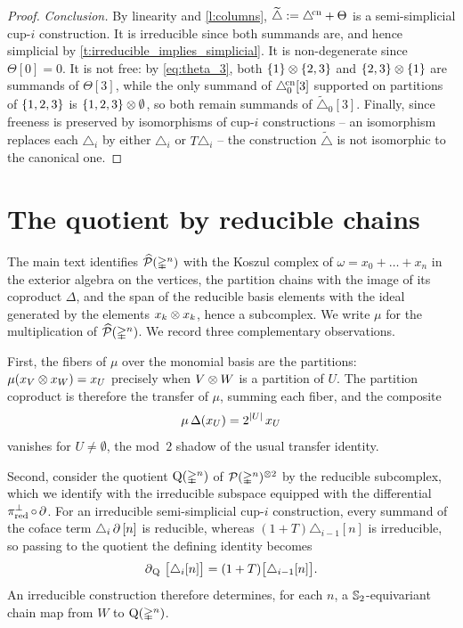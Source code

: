\documentclass{amsart}
\begin{document}
\begin{proof}
	\medskip
	\textit{Conclusion.}
	By linearity and \cref{l:columns}, $\widetilde\triangle := \triangle^{\!\mathrm{cn}} + \Theta$ is a semi-simplicial \mbox{cup-$i$} construction.
	It is irreducible since both summands are, and hence simplicial by \cref{t:irreducible_implies_simplicial}.
	It is non-degenerate since $\Theta[0] = 0$.
	It is not free: by \cref{eq:theta_3}, both $\{1\} \otimes \{2,3\}$ and $\{2,3\} \otimes \{1\}$ are summands of $\Theta[3]$, while the only summand of $\triangle^{\!\mathrm{cn}}_0[3]$ supported on partitions of $\{1,2,3\}$ is $\{1,2,3\} \otimes \emptyset$, so both remain summands of $\widetilde\triangle_0[3]$.
	Finally, since freeness is preserved by isomorphisms of \mbox{cup-$i$} constructions -- an isomorphism replaces each $\triangle_i$ by either $\triangle_i$ or $T\triangle_i$ -- the construction $\widetilde\triangle$ is not isomorphic to the canonical one.
\end{proof}

\section{The quotient by reducible chains}\label{s:quotient}

The main text identifies $\widehat{\mathcal{P}}(\mathbb{\Delta}^n)$ with the Koszul complex of $\omega = x_0 + \dots + x_n$ in the exterior algebra on the vertices, the partition chains with the image of its coproduct $\Delta$, and the span of the reducible basis elements with the ideal generated by the elements $x_k \otimes x_k$, hence a subcomplex.
We write $\mu$ for the multiplication of $\widehat{\mathcal{P}}(\mathbb{\Delta}^n)$.
We record three complementary observations.

First, the fibers of $\mu$ over the monomial basis are the partitions: $\mu(x_V \otimes x_W) = x_U$ precisely when $V \otimes W$ is a partition of $U$.
The partition coproduct is therefore the transfer of $\mu$, summing each fiber, and the composite
\[
\mu\, \Delta(x_U) = 2^{\lvert U\rvert}\, x_U
\]
vanishes for $U \neq \emptyset$, the mod~$2$ shadow of the usual transfer identity.

Second, consider the quotient $\mathrm{Q}(\mathbb{\Delta}^n)$ of $\mathcal{P}(\mathbb{\Delta}^n)^{\otimes 2}$ by the reducible subcomplex, which we identify with the irreducible subspace equipped with the differential $\operatorname{\pi^{\perp}_{\text{red}}} \circ \operatorname{\partial}$.
For an irreducible semi-simplicial \mbox{cup-$i$} construction, every summand of the coface term $\triangle_i\operatorname{\partial}\,[n]$ is reducible, whereas $(1+T)\triangle_{i-1}[n]$ is irreducible, so passing to the quotient the defining identity becomes
\[
\operatorname{\partial}_{\mathrm{Q}}\, \big[\triangle_i[n]\big] = (1+T) \big[\triangle_{i-1}[n]\big].
\]
An irreducible construction therefore determines, for each $n$, a $\mathbb{S}_2$-equivariant chain map from $W$ to $\mathrm{Q}(\mathbb{\Delta}^n)$.
\end{document}
